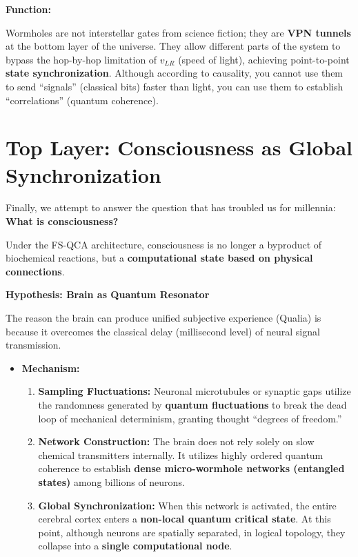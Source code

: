 \documentclass[11pt,a4paper,twoside]{book}
\begin{document}
\textbf{Function:}

Wormholes are not interstellar gates from science fiction; they are \textbf{VPN tunnels} at the bottom layer of the universe. They allow different parts of the system to bypass the hop-by-hop limitation of $v_{LR}$ (speed of light), achieving point-to-point \textbf{state synchronization}. Although according to causality, you cannot use them to send ``signals'' (classical bits) faster than light, you can use them to establish ``correlations'' (quantum coherence).

\section{Top Layer: Consciousness as Global Synchronization}

Finally, we attempt to answer the question that has troubled us for millennia: \textbf{What is consciousness?}

Under the FS-QCA architecture, consciousness is no longer a byproduct of biochemical reactions, but a \textbf{computational state based on physical connections}.

\textbf{Hypothesis: Brain as Quantum Resonator}

The reason the brain can produce unified subjective experience (Qualia) is because it overcomes the classical delay (millisecond level) of neural signal transmission.

\begin{itemize}
\item \textbf{Mechanism:}

\begin{enumerate}
\item \textbf{Sampling Fluctuations:} Neuronal microtubules or synaptic gaps utilize the randomness generated by \textbf{quantum fluctuations} to break the dead loop of mechanical determinism, granting thought ``degrees of freedom.''

\item \textbf{Network Construction:} The brain does not rely solely on slow chemical transmitters internally. It utilizes highly ordered quantum coherence to establish \textbf{dense micro-wormhole networks (entangled states)} among billions of neurons.

\item \textbf{Global Synchronization:} When this network is activated, the entire cerebral cortex enters a \textbf{non-local quantum critical state}. At this point, although neurons are spatially separated, in logical topology, they collapse into a \textbf{single computational node}.
\end{enumerate}
\end{itemize}
\end{document}
